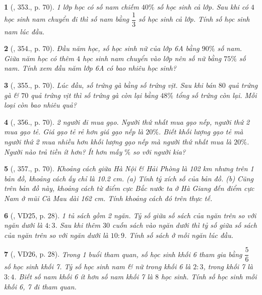 \documentclass{article}
\newtheorem{baitoan}{}
\begin{document}
\begin{baitoan}[\cite{Tuyen_Toan_6}, 353., p. 70]
	1 lớp học có số nam chiếm $40\%$ số học sinh cả lớp. Sau khi có $4$ học sinh nam chuyển đi thì số nam bằng $\dfrac{1}{3}$ số học sinh cả lớp. Tính số học sinh nam lúc đầu.
\end{baitoan}

\begin{baitoan}[\cite{Tuyen_Toan_6}, 354., p. 70]
	Đầu năm học, số học sinh nữ của lớp 6A bằng $90\%$ số nam. Giữa năm học có thêm $4$ học sinh nam chuyển vào lớp nên số nữ bằng $75\%$ số nam. Tính xem đầu năm lớp 6A có bao nhiêu học sinh?
\end{baitoan}

\begin{baitoan}[\cite{Tuyen_Toan_6}, 355., p. 70]
	Lúc đầu, số trứng gà bằng số trứng vịt. Sau khi bán $80$ quả trứng gà \& $70$ quả trứng vịt thì số trứng gà còn lại bằng $48\%$ tổng số trứng còn lại. Mỗi loại còn bao nhiêu quả?
\end{baitoan}

\begin{baitoan}[\cite{Tuyen_Toan_6}, 356., p. 70]
	2 người đi mua gạo. Người thứ nhất mua gạo nếp, người thứ 2 mua gạo tẻ. Giá gạo tẻ rẻ hơn giá gạo nếp là $20\%$. Biết khối lượng gạo tẻ mà người thứ 2 mua nhiều hơn khối lượng gạo nếp mà người thứ nhất mua là $20\%$. Người nào trả tiền ít hơn? Ít hơn mấy $\%$ so với người kia?
\end{baitoan}

\begin{baitoan}[\cite{Tuyen_Toan_6}, 357., p. 70]
	Khoảng cách giữa Hà Nội \& Hải Phòng là {\rm102 km} nhưng trên 1 bản đồ, khoảng cách ấy chỉ là {\rm10.2 cm}. (a) Tính tỷ xích số của bản đồ. (b) Cũng trên bản đồ này, khoảng cách từ điểm cực Bắc nước ta ở Hà Giang đến điểm cực Nam ở mũi Cà Mau dài {\rm162 cm}. Tính khoảng cách đó trên thực tế.
\end{baitoan}

\begin{baitoan}[\cite{Binh_Toan_6_tap_2}, VD25, p. 28]
	1 tủ sách gồm 2 ngăn. Tỷ số giữa số sách của ngăn trên so với ngăn dưới là $4:3$. Sau khi thêm $30$ cuốn sách vào ngăn dưới thì tỷ số giữa số sách của ngăn trên so với ngăn dưới là $10:9$. Tính số sách ở mỗi ngăn lúc đầu.
\end{baitoan}

\begin{baitoan}[\cite{Binh_Toan_6_tap_2}, VD26, p. 28]
	Trong 1 buổi tham quan, số học sinh khối 6 tham gia bằng $\dfrac{5}{6}$ số học sinh khối 7. Tỷ số học sinh nam \& nữ trong khối 6 là $2:3$, trong khối 7 là $3:4$. Biết số nam khối 6 ít hơn số nam khối 7 là $8$ học sinh. Tính số học sinh mỗi khối 6, 7 đi tham quan.
\end{baitoan}
\end{document}
